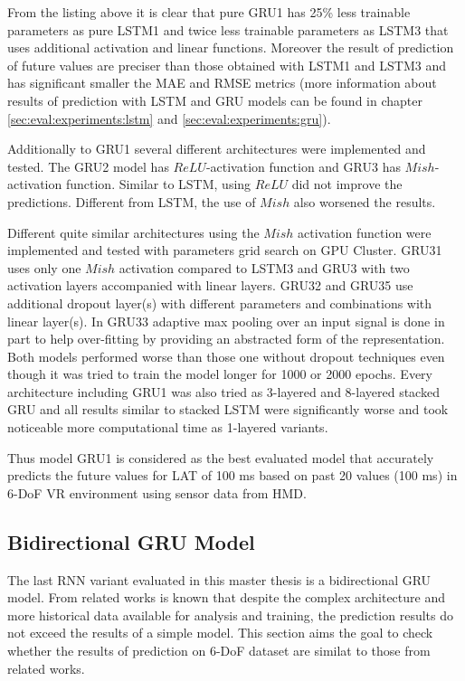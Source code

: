 From the listing above it is clear that pure GRU1 has 25\% less trainable parameters as pure LSTM1 and twice less trainable parameters as LSTM3 that uses additional activation and linear functions. Moreover the result of prediction of future values are preciser than those obtained with LSTM1 and LSTM3 and has significant smaller the MAE and RMSE metrics (more information about results of prediction with LSTM and GRU models can be found in chapter \ref{sec:eval:experiments:lstm} and \ref{sec:eval:experiments:gru}). 

Additionally to GRU1 several different architectures were implemented and tested. The GRU2 model has $ReLU$-activation function and GRU3 has $Mish$-activation function. Similar to LSTM, using $ReLU$ did not improve the predictions. Different from LSTM, the use of $Mish$ also worsened the results.     

Different quite similar architectures using the $Mish$ activation function were implemented and tested with parameters grid search on GPU Cluster. GRU31 uses only one $Mish$ activation compared to LSTM3 and GRU3 with two activation layers accompanied with linear layers. GRU32 and GRU35 use additional dropout layer(s) with different parameters and combinations with linear layer(s). In GRU33 adaptive max pooling over an input signal is done in part to help over-fitting by providing an abstracted form of the representation. Both models performed worse than those one without dropout techniques even though it was tried to train the model longer for 1000 or 2000 epochs. Every architecture including GRU1 was also tried as 3-layered and 8-layered stacked GRU and all results similar to stacked LSTM were significantly worse and took noticeable more computational time as 1-layered variants.

Thus model GRU1 is considered as the best evaluated model that accurately predicts the future values for LAT of 100 ms based on past 20 values (100 ms) in 6-DoF VR environment using sensor data from HMD.

\subsection{Bidirectional GRU Model}
\label{sec:impl:model:arch:bi-gru}

The last RNN variant evaluated in this master thesis is a bidirectional GRU model. From related works is known that despite the complex architecture and more historical data available for analysis and training, the prediction results do not exceed the results of a simple model. This section aims the goal to check whether the results of prediction on 6-DoF dataset are similat to those from related works.

